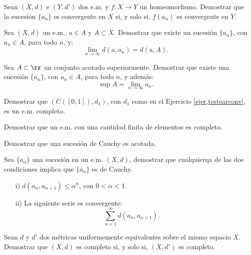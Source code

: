 \begin{ejercicio} Sean $(X,d)$ e $(Y,d')$ dos e.m. y $f:X\to Y$ un homeomorfismo.
Demostrar que la sucesi\'on $\{a_n\}$ es convergente en $X$ si, y
solo si, $f(a_n)$ es convergente en $Y$.
\end{ejercicio}



\begin{ejercicio} Sea $(X,d)$ un e.m., $a\in A$ y $A\subset X$. Demostrar
que existe un sucesi\'on $\{a_n\}$, con $a_n\in A$, para todo $n$,
y:
\[\lim\limits_{n\to\infty}d(a,a_n)=d(a,A).\]
\end{ejercicio}

\begin{ejercicio} Sea $A\subset \rr$ un conjunto acotado
superiormente. Demostrar que existe una sucesi\'on $\{a_n\}$, con
$a_n\in A$, para todo $n$, y adem\'as:
\[
    \sup A=\lim\limits_{n\to\infty} a_n.
\]
\end{ejercicio}

\begin{ejercicio} Demostrar que $(C([0,1]),d_1)$, con $d_1$ como
en el Ejercicio \ref{ejer,testearconv}, es un e.m. completo.
\end{ejercicio}

\begin{ejercicio} Demostrar que un e.m. con una cantidad finita de
elementos es completo.
\end{ejercicio}

\begin{ejercicio} Demostrar que una sucesi\'on de Cauchy es
acotada.
\end{ejercicio}

\begin{ejercicio} Sea $\{a_n\}$ una sucesi\'on en un e.m. $(X,d)$,
demostrar que cualquierqa de las dos condiciones implica que
$\{a_n\}$ es de Cauchy.
\begin{itemize}
    \item[i)] $d(a_n,a_{n+1})\leq \alpha^n$, con $0<\alpha<1$.
    \item[ii)] La siguiente serie es convergente:
    \[
        \sum\limits_{n=1}^{\infty}d(a_n,a_{n+1}).
    \]
\end{itemize}
\end{ejercicio}

\begin{ejercicio}\label{ejer,completitudconmetequi} Sean $d$ y $d'$ dos m\'etricas
 uniformemente equivalentes
sobre el mismo espacio $X$. Demostrar que $(X,d)$ es completo si,
y solo si, $(X,d')$ es completo.
\end{ejercicio}

